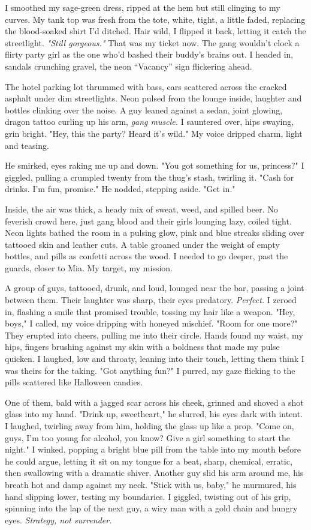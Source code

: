 \documentclass[12pt,oneside]{book} %
\begin{document}
I smoothed my sage-green dress, ripped at the hem but still clinging to my curves. My tank top was fresh from the tote, white, tight, a little faded, replacing the blood-soaked shirt I’d ditched. Hair wild, I flipped it back, letting it catch the streetlight. \textit{"Still gorgeous."} That was my ticket now. The gang wouldn’t clock a flirty party girl as the one who’d bashed their buddy’s brains out. I headed in, sandals crunching gravel, the neon “Vacancy” sign flickering ahead.

The hotel parking lot thrummed with bass, cars scattered across the cracked asphalt under dim streetlights. Neon pulsed from the lounge inside, laughter and bottles clinking over the noise. A guy leaned against a sedan, joint glowing, dragon tattoo curling up his arm, \textit{gang muscle.} I sauntered over, hips swaying, grin bright. "Hey, this the party? Heard it’s wild." My voice dripped charm, light and teasing.

He smirked, eyes raking me up and down. "You got something for us, princess?" I giggled, pulling a crumpled twenty from the thug’s stash, twirling it. "Cash for drinks. I’m fun, promise." He nodded, stepping aside. "Get in."

Inside, the air was thick, a heady mix of sweat, weed, and spilled beer. No feverish crowd here, just gang blood and their girls lounging lazy, coiled tight. Neon lights bathed the room in a pulsing glow, pink and blue streaks sliding over tattooed skin and leather cuts. A table groaned under the weight of empty bottles, and pills as confetti across the wood. I needed to go deeper, past the guards, closer to Mia. My target, my mission.

A group of guys, tattooed, drunk, and loud, lounged near the bar, passing a joint between them. Their laughter was sharp, their eyes predatory. \textit{Perfect.} I zeroed in, flashing a smile that promised trouble, tossing my hair like a weapon. "Hey, boys," I called, my voice dripping with honeyed mischief. "Room for one more?" They erupted into cheers, pulling me into their circle. Hands found my waist, my hips, fingers brushing against my skin with a boldness that made my pulse quicken. I laughed, low and throaty, leaning into their touch, letting them think I was theirs for the taking. "Got anything fun?" I purred, my gaze flicking to the pills scattered like Halloween candies.

One of them, bald with a jagged scar across his cheek, grinned and shoved a shot glass into my hand. "Drink up, sweetheart," he slurred, his eyes dark with intent. I laughed, twirling away from him, holding the glass up like a prop. "Come on, guys, I’m too young for alcohol, you know? Give a girl something to start the night." I winked, popping a bright blue pill from the table into my mouth before he could argue, letting it sit on my tongue for a beat, sharp, chemical, erratic, then swallowing with a dramatic shiver. Another guy slid his arm around me, his breath hot and damp against my neck. "Stick with us, baby," he murmured, his hand slipping lower, testing my boundaries. I giggled, twisting out of his grip, spinning into the lap of the next guy, a wiry man with a gold chain and hungry eyes. \textit{Strategy, not surrender.}
\end{document}
